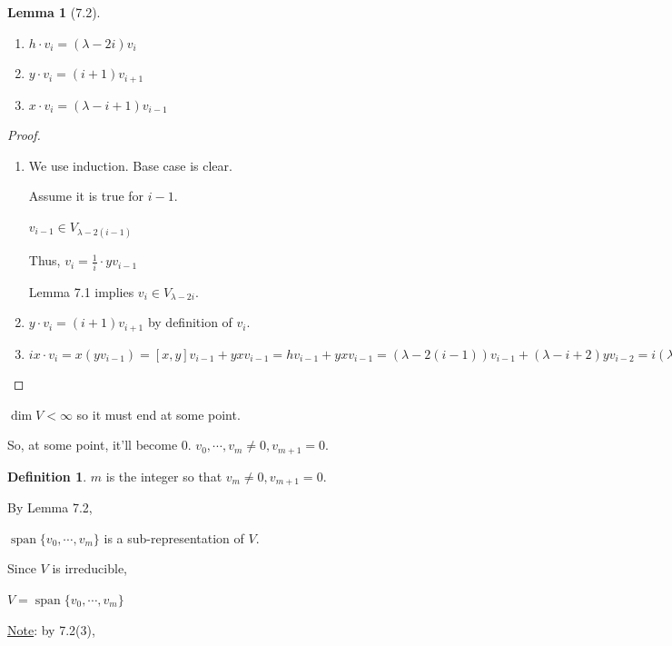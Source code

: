 \documentclass{article}
\theoremstyle{definition}
\newtheorem*{definition}{Definition}
\newtheorem{lemma}[theorem]{Lemma}
\renewcommand{\span}{\operatorname{span}}
\begin{document}
\begin{lemma}
    [7.2]

    \begin{enumerate}[label=\arabic*)]
        \item \(h\cdot v_i = (\lambda - 2i)v_i\) 
        \item \(y\cdot v_i = (i+1)v_{i+1}\)
        \item \(x\cdot v_i = (\lambda - i + 1) v_{i-1}\)  
    \end{enumerate} 
\end{lemma}

\begin{proof}
    \begin{enumerate}[label=\arabic*)]
        \item We use induction. Base case is clear.
        
        Assume it is true for \(i-1\). 

        \(v_{i-1} \in V_{\lambda - 2(i-1)}\) 

        Thus, \(v_i = \frac{1}{i} \cdot y v_{i-1}\)
        
        Lemma 7.1 implies \(v_i \in V_{\lambda - 2i}\).

        \item \(y\cdot v_i = (i+1) v_{i+1}\) by definition of \(v_i\). 
        
        \item \(i x\cdot v_i = x (yv_{i-1}) = [x,y]v_{i-1} + yx v_{i-1} = h v_{i-1} + y x v_{i-1} = (\lambda - 2(i-1))v_{i-1} + (\lambda -i + 2)y v_{i-2} = i(\lambda -i + 1)v_{i-1}\) 
    \end{enumerate} 
\end{proof}

\(\dim V < \infty\) so it must end at some point.

So, at some point, it'll become \(0\). \(v_0, \cdots ,v_m \neq 0, v_{m+1} = 0\).

\begin{definition}
    \(m\) is the integer so that \(v_m \neq 0, v_{m+1} = 0\).
\end{definition}

By Lemma 7.2,

\(\span \{v_0, \cdots , v_m\}\) is a sub-representation of \(V\).

Since \(V\) is irreducible,

\(V = \span \{v_0, \cdots , v_m\}\) 

\underline{Note}: by 7.2(3),
\end{document}
